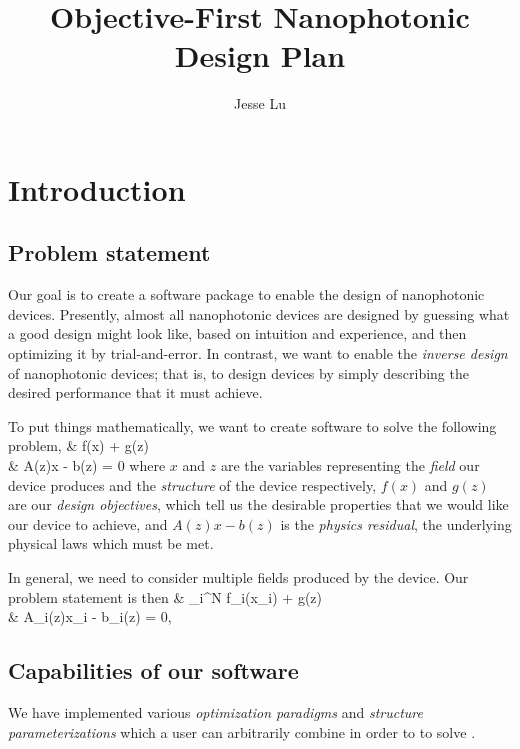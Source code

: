 \documentclass{book}
\title{Objective-First Nanophotonic Design Plan}
\author{Jesse Lu}
\begin{document}
\maketitle
\tableofcontents


\chapter{Introduction}
\section{Problem statement}
Our goal is to create a software package 
    to enable the design of nanophotonic devices.
Presently, almost all nanophotonic devices are designed
    by guessing what a good design might look like,
    based on intuition and experience,
    and then optimizing it by trial-and-error.
In contrast, we want to enable the \emph{inverse design}
    of nanophotonic devices;
    that is, to design devices by simply describing the 
    desired performance that it must achieve.

To put things mathematically, we want to create software 
    to solve the following problem,
        {\minimize&  f(x) + g(z) \\
        \subto&     A(z)x - b(z) = 0}
    where 
    \BI $x$ and $z$ are the variables representing 
            the \emph{field} our device produces and
            the \emph{structure} of the device respectively,
    \I  $f(x)$ and $g(z)$ are our \emph{design objectives},
            which tell us the desirable properties 
            that we would like our device to achieve, and
    \I  $A(z)x - b(z)$ is the \emph{physics residual},
            the underlying physical laws which must be met. \EI

In general, we need to consider multiple fields produced 
    by the device.
Our problem statement is then
        {\minimize&  \sum_i^N f_i(x_i) + g(z) \\
        \subto&     A_i(z)x_i - b_i(z) = 0,\quad{}}

\section{Capabilities of our software}\label{capabilities of our software}
We have implemented various 
    \emph{optimization paradigms} and \emph{structure parameterizations}
    which a user can arbitrarily combine in order to 
    to solve .
\end{document}
